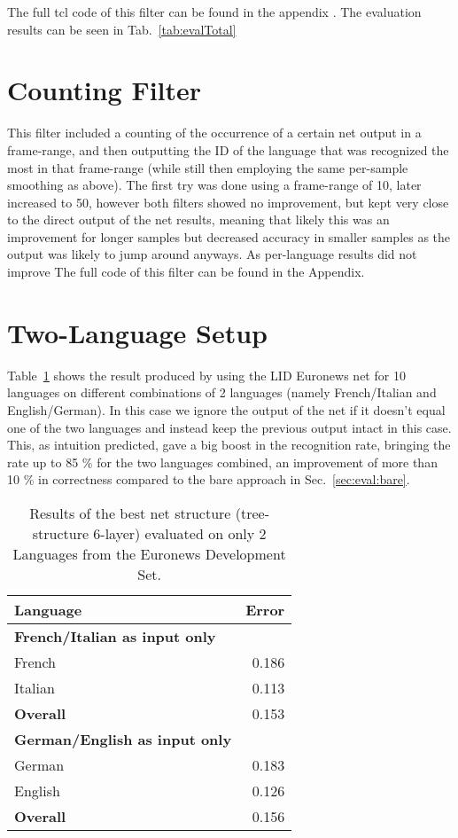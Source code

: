 The full tcl code of this filter can be found in the appendix . The evaluation results can be seen in Tab.~\ref{tab:evalTotal}

\section{Counting Filter}
This filter included a counting of the occurrence of a certain net output in a frame-range, and then outputting the ID of the language that was recognized the most in that frame-range (while still then employing the same  per-sample smoothing as above). The first try was done using a frame-range of 10, later increased to 50, however both filters showed no improvement, but kept very close to the direct output of the net results, meaning that likely this was an improvement for longer samples but decreased accuracy in smaller samples as the output was likely to jump around anyways. As per-language results did not improve 
The full code of this filter can be found in the Appendix.

\section{Two-Language Setup}
\label{sec:eval:2L}
Table~\ref{tab:eval2L} shows the result produced by using the LID Euronews net for 10 languages on different combinations of 2 languages (namely French/Italian and English/German). In this case we ignore the output of the net if it doesn't equal one of the two languages and instead keep the previous output intact in this case. This, as intuition predicted, gave a big boost in the recognition rate, bringing the rate up to 85 \% for the two languages combined, an improvement of more than 10 \% in correctness compared to the bare approach in Sec.~\ref{sec:eval:bare}.

\begin{table}[h!]
\label{tab:eval2L}
\centering
\begin{tabular}{| l | r |}
	\hline
	\textbf{Language} & \textbf{Error}  \\
	\hline
	\textbf{French/Italian as input only} & \\
	 French &  0.186 \\
	Italian & 0.113 \\
	\hline
	\textbf{Overall} & 0.153 \\
	\hline
	\textbf{German/English as input only} & \\
	German & 0.183 \\
	English & 0.126 \\
	\hline
	\textbf{Overall} & 0.156 \\
	\hline
\end{tabular}
\caption{Results of the best net structure (tree-structure 6-layer) evaluated on only 2 Languages from the Euronews Development Set.}
\end{table}

